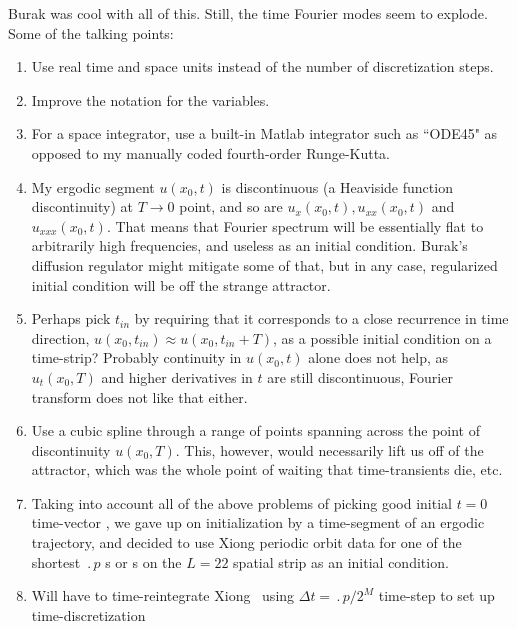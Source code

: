 \begin{description}
{\begin{description}
    Burak was cool with all of this. Still, the time Fourier modes seem to explode.
      Some of the talking points:
        \begin{enumerate}
        \item Use real time and space units instead of the number of
            discretization steps.
        \item Improve the notation for the variables.
        \item  For a space integrator, use a built-in Matlab integrator
            such as ``ODE45" as opposed to my manually coded fourth-order
            Runge-Kutta.
        \item My ergodic segment $u(x_0,t)$ is discontinuous (a
            Heaviside function discontinuity) at $T \to0 $ point, and so
            are ${u}_{x}(x_0,t),{u}_{xx}(x_0,t)$ and ${u}_{xxx}(x_0,t)$.
            That means that Fourier spectrum will be essentially flat to
            arbitrarily high frequencies, and useless as an initial
            condition. Burak's diffusion regulator might mitigate some of
            that, but in any case, regularized initial condition will be
            off the strange attractor.
         \item Perhaps pick $t_{in}$ by requiring that it corresponds
            to a close recurrence in time direction, $u(x_0,t_{in})
            \approx u(x_0,t_{in}+T)$, as a possible initial condition on
            a time-strip? Probably continuity in $u(x_0,t)$ alone does
            not help, as $u_t(x_0,T)$ and higher derivatives in $t$ are
            still discontinuous, Fourier transform does not like that
            either.
         \item Use a cubic spline through a range of points spanning across the
            point of discontinuity $u(x_0,T)$. This, however, would
            necessarily lift us off of the attractor, which was the whole
            point of waiting that time-transients die, etc.
        \item  Taking into account all of the above problems of
            picking good initial $t=0$ time-vector , we gave
            up on initialization by a time-segment of an ergodic
            trajectory, and decided to use Xiong periodic orbit data for
            one of the shortest $\period{p}$ {\rpo}s or {\ppo}s on the
            $L=22$ spatial strip as an initial condition.
        \item Will have to time-reintegrate Xiong \po\ using $\Delta t =
            \period{p}/2^{M}$ time-step to set up time-discretization

\end{enumerate}
\end{description}}
\end{description}
